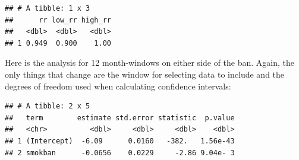\documentclass[
]{book}
\newenvironment{Shaded}{\begin{snugshade}}{\end{snugshade}}
\newcommand{\DataTypeTok}[1]{\textcolor[rgb]{0.13,0.29,0.53}{#1}}
\newcommand{\DecValTok}[1]{\textcolor[rgb]{0.00,0.00,0.81}{#1}}
\newcommand{\FloatTok}[1]{\textcolor[rgb]{0.00,0.00,0.81}{#1}}
\newcommand{\KeywordTok}[1]{\textcolor[rgb]{0.13,0.29,0.53}{\textbf{#1}}}
\newcommand{\NormalTok}[1]{#1}
\newcommand{\OperatorTok}[1]{\textcolor[rgb]{0.81,0.36,0.00}{\textbf{#1}}}
\newcommand{\StringTok}[1]{\textcolor[rgb]{0.31,0.60,0.02}{#1}}
\begin{document}
\begin{verbatim}
## # A tibble: 1 x 3
##      rr low_rr high_rr
##   <dbl>  <dbl>   <dbl>
## 1 0.949  0.900    1.00
\end{verbatim}

Here is the analysis for 12 month-windows
on either side of the ban. Again, the only things that change are the window for selecting data to include and the degrees of freedom used when calculating confidence intervals:

\begin{Shaded}
\end{Shaded}

\begin{verbatim}
## # A tibble: 2 x 5
##   term        estimate std.error statistic  p.value
##   <chr>          <dbl>     <dbl>     <dbl>    <dbl>
## 1 (Intercept)  -6.09      0.0160   -382.   1.56e-43
## 2 smokban      -0.0656    0.0229     -2.86 9.04e- 3
\end{verbatim}

\begin{Shaded}
\end{Shaded}
\end{document}
